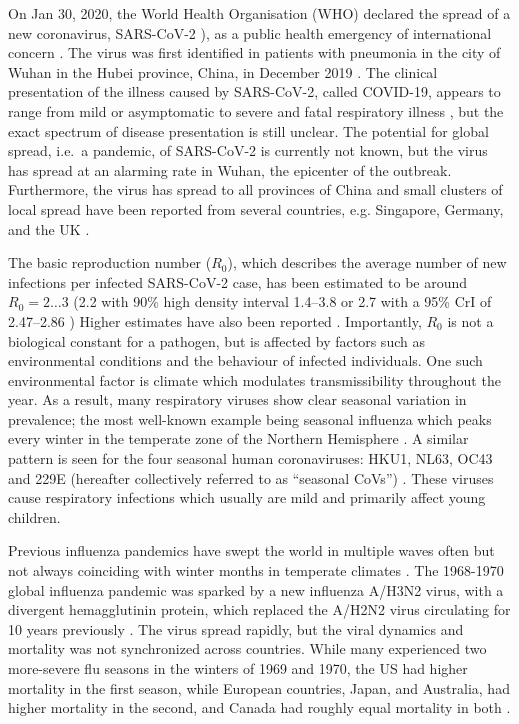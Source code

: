 \documentclass[rmp, reprint, superscriptaddress, floatfix,amsmath]{revtex4-1}
\begin{document}
On Jan 30, 2020, the World Health Organisation (WHO) declared the spread of a new coronavirus, SARS-CoV-2 \citep{ICTV_SARS-CoV-2}), as a public health emergency of international concern \citep{WHO_statement}.
The virus was first identified in patients with pneumonia in the city of Wuhan in the Hubei province, China, in December 2019 \citep{Liangjun2020rna}.
The clinical presentation of the illness caused by SARS-CoV-2, called COVID-19, appears to range from mild or asymptomatic to severe and fatal respiratory illness \citep{WHO_situation_report23}, but the exact spectrum of disease presentation is still unclear. 
The potential for global spread, i.e.~a pandemic, of SARS-CoV-2 is currently not known, but the virus has spread at an alarming rate in Wuhan, the epicenter of the outbreak. Furthermore, the virus has spread to all provinces of China and small clusters of local spread have been reported from several countries, e.g. Singapore, Germany, and the UK \citep{WHO_situation_report23, rothe2020transmission, MOH_Singapore}. 

The basic reproduction number ($R_0$), which describes the average number of new infections per infected SARS-CoV-2 case, has been estimated to be around $R_0 = 2 \ldots 3$ (2.2  with 90\% high density interval 1.4–3.8 \citep{Riou2020pattern} or 2.7 with a 95\% CrI of 2.47–2.86 \citep{wu_nowcasting_2020})
Higher estimates have also been reported \citep{yang_epidemiological_2020}. Importantly, $R_0$ is not a biological constant for a pathogen, but is affected by factors such as environmental conditions and the behaviour of infected individuals. One such environmental factor is climate which modulates transmissibility throughout the year. 
As a result, many respiratory viruses show clear seasonal variation in prevalence; the most well-known example being seasonal influenza which peaks every winter in the temperate zone of the Northern Hemisphere \citep{petrova_evolution_2018}. 
A similar pattern is seen for the four seasonal human coronaviruses: HKU1, NL63, OC43 and 229E (hereafter collectively referred to as ``seasonal CoVs'') \citep{killerby2018human,goes2019typical,galanti2019longitudinal,friedman2018human,al2016diversity,huang2017epidemiology}. 
These viruses cause respiratory infections which usually are mild and primarily affect young children. 
         
Previous influenza pandemics have swept the world in multiple waves often but not always coinciding with winter months in temperate climates \citep{taubenberger_1918_2019,viboud_multinational_2005,viboud_global_2016,amato-gauci_surveillance_2011}. 
The 1968-1970 global influenza pandemic was sparked by a new influenza A/H3N2 virus, with a divergent hemagglutinin protein, which replaced the A/H2N2 virus circulating for 10 years previously \citep{viboud_multinational_2005}. The virus spread rapidly, but the viral dynamics and mortality was not synchronized across countries.
While many experienced two more-severe flu seasons in the winters of 1969 and 1970, the US had higher mortality in the first season, while European countries, Japan, and Australia, had higher mortality in the second, and Canada had roughly equal mortality in both \citep{viboud_multinational_2005}.
\end{document}
